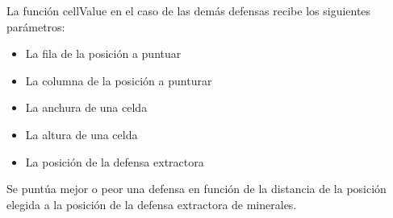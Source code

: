 La función cellValue en el caso de las demás defensas recibe los siguientes parámetros:
\begin{itemize}
    \item La fila de la posición a puntuar
    \item La columna de la posición a punturar
    \item La anchura de una celda
    \item La altura de una celda
    \item La posición de la defensa extractora
\end{itemize}

Se puntúa mejor o peor una defensa en función de la distancia de la posición elegida a la posición de la defensa extractora de minerales.
